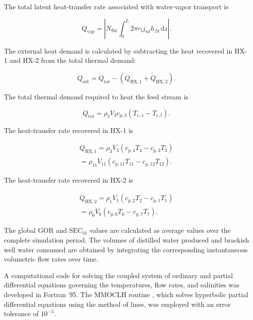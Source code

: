 \documentclass[14pt,letterpaper,fleqn]{extarticle}
\begin{document}
The total latent heat-transfer rate associated with water-vapor transport is

\begin{equation}
\dot{Q}_{\mathrm{vap}}
=
\left|
N_{\mathrm{fbr}}
\int_{0}^{L}
2\pi r_l
j_{wl}h_{fg}
\,\mathrm{d}z
\right|.
\label{eq:total-vapor-heat}
\end{equation}

The external heat demand is calculated by subtracting the heat recovered in
HX-1 and HX-2 from the total thermal demand:

\begin{equation}
\dot{Q}_{\mathrm{ext}}
=
\dot{Q}_{\mathrm{tot}}
-
\left(
\dot{Q}_{\mathrm{HX},1}
+
\dot{Q}_{\mathrm{HX},2}
\right).
\label{eq:external-heat-demand}
\end{equation}

The total thermal demand required to heat the feed stream is

\begin{equation}
\dot{Q}_{\mathrm{tot}}
=
\rho_3\dot{V}_3c_{p,3}
\left(
T_{e,s}-T_{e,l}
\right).
\label{eq:total-thermal-demand}
\end{equation}

The heat-transfer rate recovered in HX-1 is

\begin{multline}
\dot{Q}_{\mathrm{HX},1}
=
\rho_3\dot{V}_3
\left(
c_{p,4}T_4-c_{p,3}T_3
\right)
\\
=
\rho_{11}\dot{V}_{11}
\left(
c_{p,11}T_{11}-c_{p,12}T_{12}
\right).
\label{eq:hx1-recovered-heat}
\end{multline}

The heat-transfer rate recovered in HX-2 is

\begin{multline}
\dot{Q}_{\mathrm{HX},2}
=
\rho_1\dot{V}_1
\left(
c_{p,2}T_2-c_{p,1}T_1
\right)
\\
=
\rho_6\dot{V}_6
\left(
c_{p,6}T_6-c_{p,7}T_7
\right).
\label{eq:hx2-recovered-heat}
\end{multline}

The global $\mathrm{GOR}$ and $\mathrm{SEC}_{th}$ values are calculated as
average values over the complete simulation period. The volumes of distilled
water produced and brackish well water consumed are obtained by integrating
the corresponding instantaneous volumetric flow rates over time.

A computational code for solving the coupled system of ordinary and partial
differential equations governing the temperatures, flow rates, and salinities
was developed in Fortran~95. The MMOCLH routine \citep{IMSL2022}, which solves
hyperbolic partial differential equations using the method of lines, was
employed with an error tolerance of $10^{-5}$.
\end{document}
